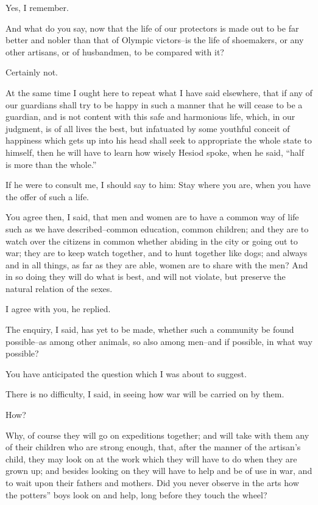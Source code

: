 Yes, I remember.

And what do you say, now that the life of our protectors is made out to
be far better and nobler than that of Olympic victors--is the life of
shoemakers, or any other artisans, or of husbandmen, to be compared with
it?

Certainly not.

At the same time I ought here to repeat what I have said elsewhere, that
if any of our guardians shall try to be happy in such a manner that
he will cease to be a guardian, and is not content with this safe and
harmonious life, which, in our judgment, is of all lives the best, but
infatuated by some youthful conceit of happiness which gets up into his
head shall seek to appropriate the whole state to himself, then he will
have to learn how wisely Hesiod spoke, when he said, ``half is more than
the whole.''

If he were to consult me, I should say to him: Stay where you are, when
you have the offer of such a life.

You agree then, I said, that men and women are to have a common way of
life such as we have described--common education, common children; and
they are to watch over the citizens in common whether abiding in the
city or going out to war; they are to keep watch together, and to hunt
together like dogs; and always and in all things, as far as they are
able, women are to share with the men? And in so doing they will do what
is best, and will not violate, but preserve the natural relation of the
sexes.

I agree with you, he replied.

The enquiry, I said, has yet to be made, whether such a community
be found possible--as among other animals, so also among men--and if
possible, in what way possible?

You have anticipated the question which I was about to suggest.

There is no difficulty, I said, in seeing how war will be carried on by
them.

How?

Why, of course they will go on expeditions together; and will take with
them any of their children who are strong enough, that, after the manner
of the artisan's child, they may look on at the work which they will
have to do when they are grown up; and besides looking on they will
have to help and be of use in war, and to wait upon their fathers and
mothers. Did you never observe in the arts how the potters'' boys look on
and help, long before they touch the wheel?

